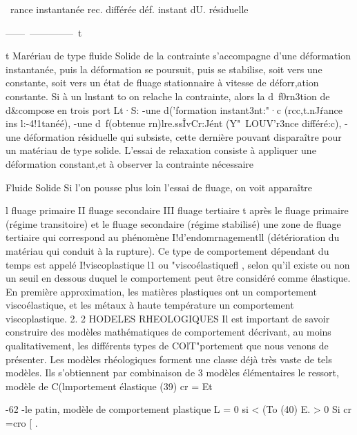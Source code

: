 ~rance 
instantanée 
rec. différée 
déf. 
instant dU. résiduelle 

------~--------------~t 

t 
Marériau de type fluide Solide 
de la contrainte s'accompagne d'une déformation instantanée, puis la déforma­tion se poursuit, puis se stabilise, soit vers une constante, soit vers un état de fluage stationnaire à vitesse de déforr,ation constante. Si à un lns­tant to on relache la contrainte, alors la d~f0rn3tion de d&compose en trois port Lt·S: 
-une d('formation instant3nt:"·c (rcc,t.nJ\'rance ins l:-4!1tanéé), 
-une d~f(\rmation obtenue rn)lre.ssÎvCr:Jént (Y"~LOUV'r3nce différé:c), 
-une déformation résiduelle qui subsiste, cette dernière pouvant disparaître pour un matériau de type solide. 
L'essai de relaxation consiste à appliquer une déformation constant,­et à observer la contrainte nécessaire 

Fluide Solide Si l'on pousse plus loin l'essai de fluage, on voit apparaître 

l fluage primaire II fluage secondaire III fluage tertiaire 
t 
après le fluage primaire (régime transitoire) et le fluage secondaire (régime stabilisé) une zone de fluage tertiaire qui correspond au phénomène I!d'endom­rnagementll (détérioration du matériau qui conduit à la rupture). 
Ce type de comportement dépendant du temps est appelé I!viscoplasti­que l1 ou "viscoélastiquefl , selon qu'il existe ou non un seuil en dessous du­quel le comportement peut être considéré comme élastique. En première appro­ximation, les matières plastiques ont un comportement viscoélastique, et les métaux à haute température un comportement viscoplastique. 
2. 2 HODELES RHEOLOGIQUES 
Il est important de savoir construire des modèles mathématiques de comportement décrivant, au moins qualitativement, les différents types de COlT"­portement que nous venons de présenter. Les modèles rhéologiques forment une classe déjà très vaste de tels modèles. Ils s'obtiennent par combinaison de 3 modèles élémentaires 
le ressort, modèle de C(lmportement élastique 
(39) cr = Et 

-62 ­-le patin, modèle de comportement plastique 
L = 0 si < (To 
(40) E. > 0 Si cr 
=cro
[ . 


